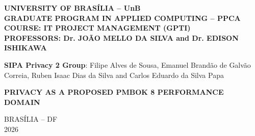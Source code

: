 \documentclass[12pt,a4paper,article,oneside,brazil,english]{abntex2}
\newcommand{\integrantes}{Filipe Alves de Sousa, Emanuel Brandão de Galvão Correia, Ruben Isaac Dias da Silva and Carlos Eduardo da Silva Papa}
\newif\ifavisocapa   \avisocapafalse    %
\begin{document}
\thispagestyle{empty}
\noindent\begin{minipage}[t][0.92\textheight]{\textwidth}
\centering
\SingleSpacing
\textbf{UNIVERSITY OF BRASÍLIA -- UnB\\GRADUATE PROGRAM IN APPLIED COMPUTING -- PPCA\\COURSE: IT PROJECT MANAGEMENT (GPTI)\\PROFESSORS: Dr. JOÃO MELLO DA SILVA and Dr. EDISON ISHIKAWA}

\vspace{1cm}

\textbf{SIPA Privacy 2 Group}: \integrantes

\vspace{3cm}

\textbf{PRIVACY AS A PROPOSED PMBOK 8 PERFORMANCE DOMAIN}

\vspace{1.2cm}
\ifavisocapa
\begin{center}\fbox{\parbox{\dimexpr\linewidth-2\fboxsep-2\fboxrule\relax}{\SingleSpacing\small\noindent\textbf{Statement on the use of artificial intelligence.} Generative AI (ChatGPT Astral 6 Sol and Sonnet 5.5, both in high mode) was used to support text editing, formatting, figure creation, and table drafting. AI is not an author: the group is responsible for the content, in line with the COPE position on authorship and AI tools (COPE, 2023).\par\smallskip\noindent COMMITTEE ON PUBLICATION ETHICS (COPE). \textit{Authorship and AI tools: COPE position statement}. 13 Feb. 2023. Available at: \url{https://publicationethics.org/guidance/cope-position/authorship-and-ai-tools}.}}\end{center}
\fi
\vfill

BRASÍLIA -- DF\\2026
\end{minipage}
\clearpage
\end{document}
